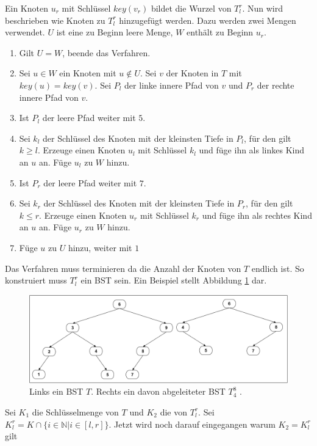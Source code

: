 \documentclass[a4paper,12pt]{article}
\begin{document}
\noindent Ein Knoten $u_r$ mit Schlüssel $\mathit{key}(v_r)$ bildet die Wurzel von $T^r_l$. Nun wird beschrieben wie Knoten zu $T^r_l$ hinzugefügt werden.
Dazu werden zwei Mengen verwendet. $U$ ist eine zu Beginn leere Menge, $W$ enthält zu Beginn $u_r$.
\begin{enumerate}
	\item Gilt $U = W$, beende das Verfahren.
	\item Sei $u \in W$ ein Knoten mit $u \notin U$.  Sei $v$ der Knoten in $T$ mit $\mathit{key}(u ) = \mathit{key}(v)$. Sei $P_l$ der linke innere Pfad von $v$ und $P_r$ der rechte innere Pfad von $v$.
	\item Ist $P_l$ der leere Pfad weiter mit $5$.
	\item Sei $k_l$ der Schlüssel des Knoten mit der kleinsten Tiefe in $P_l$, für den gilt $k \geq l$. Erzeuge einen Knoten $u_l$ mit Schlüssel $k_l$ und füge ihn als linkes Kind an $u$ an. Füge $u_l$ zu $W$ hinzu.
	\item Ist $P_r$ der leere Pfad weiter mit $7$.
	\item Sei $k_r$ der Schlüssel des Knoten mit der kleinsten Tiefe in $P_r$, für den gilt  $k \leq r$. Erzeuge einen Knoten $u_r$ mit Schlüssel $k_r$ und füge ihn als rechtes Kind an $u$ an. Füge $u_r$ zu $W$ hinzu.	
	\item Füge $u$ zu $U$ hinzu, weiter mit $1$
\end{enumerate}
Das Verfahren muss terminieren da die Anzahl der Knoten von $T$ endlich ist. So konstruiert muss $T^r_l$ ein BST sein. Ein Beispiel stellt Abbildung \ref{fig:T_r_l} dar. 
\begin{figure}[h]
	\centering
	\includegraphics[width= 1\textwidth]{"Medien/DynOpt/T_r_l"}
	\caption{Links ein BST $T$. Rechts ein davon abgeleiteter BST $T^8_4$ .  }
	\label{fig:T_r_l}
\end{figure}

 \noindent Sei $K_1$ die Schlüsselmenge von $T$ und $K_2$ die von $T^r_l$. Sei ${K^r_l = K \cap \{i \in \mathbb{N}\vert i \in \left[l,r\right] \}}$. Jetzt wird noch darauf eingegangen warum $K_2 = K^r_l$ gilt \\
\end{document}
